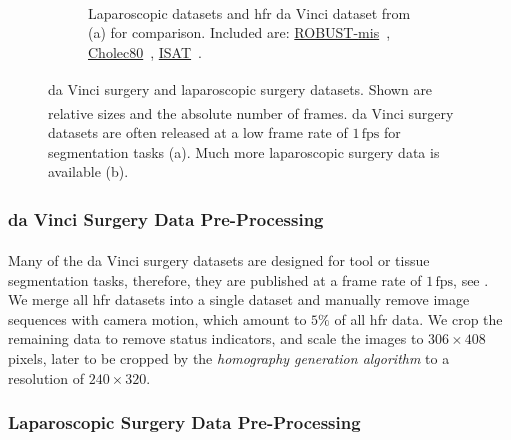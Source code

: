 \begin{figure}[tb]
\begin{subfigure}[b]{0.49\textwidth}
    \caption{Laparoscopic datasets and \gls{hfr} da Vinci\textsuperscript{\textregistered} dataset from (a) for comparison. Included are: \href{https://robustmis2019.grand-challenge.org/}{ROBUST-\gls{mis}}~\cite{maier2020heidelberg}, \href{http://camma.u-strasbg.fr/datasets}{Cholec80}~\cite{twinanda2016endonet}, \href{https://endovissub-instrument.grand-challenge.org/}{ISAT}~\cite{bodenstedt2018comparative}.}
    \label{c3:fig:data_b}
\end{subfigure}    
\caption{da Vinci\textsuperscript{\textregistered} surgery and laparoscopic surgery datasets. Shown are relative sizes and the absolute number of frames. da Vinci\textsuperscript{\textregistered} surgery datasets are often released at a low frame rate of $1\,\text{fps}$ for segmentation tasks (a). Much more laparoscopic surgery data is available (b).}
\label{c3:fig:data}
\end{figure}

\subsubsection{da Vinci\texorpdfstring{\textsuperscript{\textregistered}}{} Surgery Data Pre-Processing}

Many of the da Vinci\textsuperscript{\textregistered} surgery datasets are designed for tool or tissue segmentation tasks, therefore, they are published at a frame rate of $1\,\text{fps}$, see . We merge all \gls{hfr} datasets into a single dataset and manually remove image sequences with camera motion, which amount to $5\%$ of all
\gls{hfr} data. We crop the remaining data to remove status indicators, and scale the images to $306\times408$ pixels, later to be cropped by the \textit{homography generation algorithm} to a resolution of $240\times320$.

\subsubsection{Laparoscopic Surgery Data Pre-Processing}
\label{c3:sec:lap_pre}

